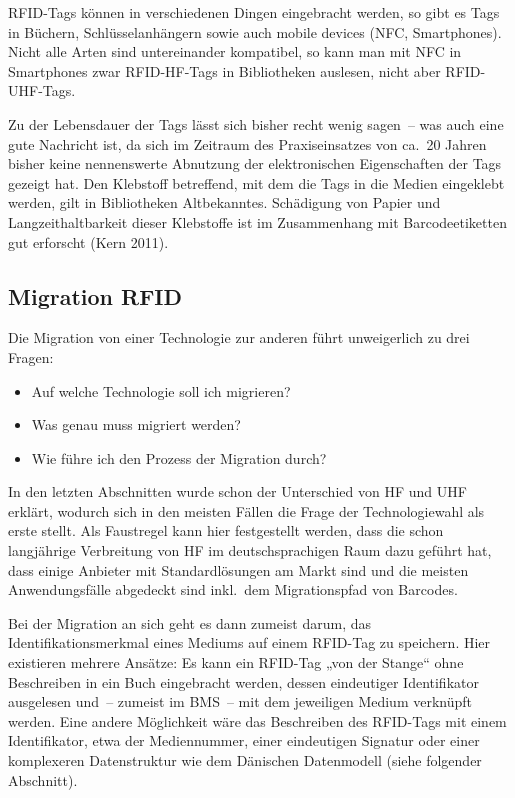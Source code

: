 \documentclass[
  11pt,
  letterpaper,
  DIV=11,
  twoside]{scrreprt}
\begin{document}
RFID-Tags können in verschiedenen Dingen eingebracht werden, so gibt es
Tags in Büchern, Schlüsselanhängern sowie auch mobile devices (NFC,
Smartphones). Nicht alle Arten sind untereinander kompatibel, so kann
man mit NFC in Smartphones zwar RFID-HF-Tags in Bibliotheken auslesen,
nicht aber RFID-UHF-Tags.

Zu der Lebensdauer der Tags lässt sich bisher recht wenig sagen~-- was
auch eine gute Nachricht ist, da sich im Zeitraum des Praxiseinsatzes
von ca.~20 Jahren bisher keine nennenswerte Abnutzung der elektronischen
Eigenschaften der Tags gezeigt hat. Den Klebstoff betreffend, mit dem
die Tags in die Medien eingeklebt werden, gilt in Bibliotheken
Altbekanntes. Schädigung von Papier und Langzeithaltbarkeit dieser
Klebstoffe ist im Zusammenhang mit Barcodeetiketten gut erforscht (Kern
2011).

\subsection{Migration RFID}\label{migration-rfid}

Die Migration von einer Technologie zur anderen führt unweigerlich zu
drei Fragen:

\begin{itemize}
\item
  Auf welche Technologie soll ich migrieren?
\item
  Was genau muss migriert werden?
\item
  Wie führe ich den Prozess der Migration durch?
\end{itemize}

In den letzten Abschnitten wurde schon der Unterschied von HF und UHF
erklärt, wodurch sich in den meisten Fällen die Frage der
Technologiewahl als erste stellt. Als Faustregel kann hier festgestellt
werden, dass die schon langjährige Verbreitung von HF im
deutschsprachigen Raum dazu geführt hat, dass einige Anbieter mit
Standardlösungen am Markt sind und die meisten Anwendungsfälle abgedeckt
sind inkl.~dem Migrationspfad von Barcodes.

Bei der Migration an sich geht es dann zumeist darum, das
Identifikationsmerkmal eines Mediums auf einem RFID-Tag zu speichern.
Hier existieren mehrere Ansätze: Es kann ein RFID-Tag „von der Stange``
ohne Beschreiben in ein Buch eingebracht werden, dessen eindeutiger
Identifikator ausgelesen und~-- zumeist im BMS~-- mit dem jeweiligen
Medium verknüpft werden. Eine andere Möglichkeit wäre das Beschreiben
des RFID-Tags mit einem Identifikator, etwa der Mediennummer, einer
eindeutigen Signatur oder einer komplexeren Datenstruktur wie dem
Dänischen Datenmodell (siehe folgender Abschnitt).
\end{document}
